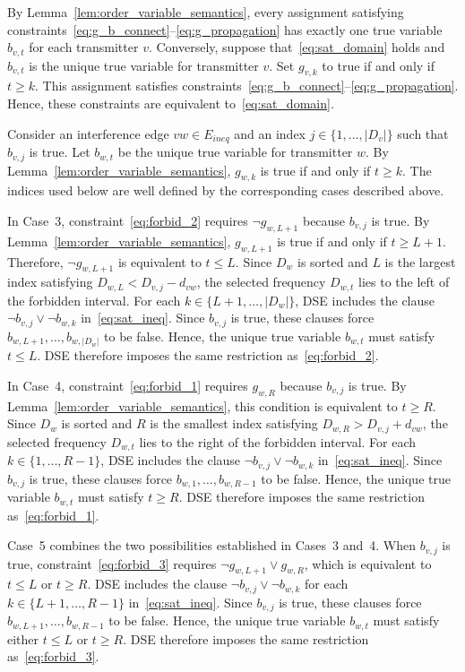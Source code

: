 \documentclass[letterpaper,journal]{IEEEtran}
\begin{document}
\begin{IEEEproof}
By Lemma~\ref{lem:order_variable_semantics}, every assignment satisfying constraints~\eqref{eq:g_b_connect}--\eqref{eq:g_propagation} has exactly one true variable $b_{v,t}$ for each transmitter $v$. Conversely, suppose that~\eqref{eq:sat_domain} holds and $b_{v,t}$ is the unique true variable for transmitter $v$. Set $g_{v,k}$ to true if and only if $t\ge k$. This assignment satisfies constraints~\eqref{eq:g_b_connect}--\eqref{eq:g_propagation}. Hence, these constraints are equivalent to~\eqref{eq:sat_domain}.

Consider an interference edge $vw\in E_{ineq}$ and an index $j\in\{1,\ldots,|D_v|\}$ such that $b_{v,j}$ is true. Let $b_{w,t}$ be the unique true variable for transmitter $w$. By Lemma~\ref{lem:order_variable_semantics}, $g_{w,k}$ is true if and only if $t\ge k$.
The indices used below are well defined by the corresponding cases described above.

In Case~3, constraint~\eqref{eq:forbid_2} requires $\neg g_{w,L+1}$ because $b_{v,j}$ is true. By Lemma~\ref{lem:order_variable_semantics}, $g_{w,L+1}$ is true if and only if $t\ge L+1$. Therefore, $\neg g_{w,L+1}$ is equivalent to $t\le L$. Since $D_w$ is sorted and $L$ is the largest index satisfying $D_{w,L}<D_{v,j}-d_{vw}$, the selected frequency $D_{w,t}$ lies to the left of the forbidden interval.
For each $k\in\{L+1,\ldots,|D_w|\}$, DSE includes the clause $\neg b_{v,j}\lor\neg b_{w,k}$ in~\eqref{eq:sat_ineq}. Since $b_{v,j}$ is true, these clauses force $b_{w,L+1},\ldots,b_{w,|D_w|}$ to be false. Hence, the unique true variable $b_{w,t}$ must satisfy $t\le L$. DSE therefore imposes the same restriction as~\eqref{eq:forbid_2}.

In Case~4, constraint~\eqref{eq:forbid_1} requires $g_{w,R}$ because $b_{v,j}$ is true. By Lemma~\ref{lem:order_variable_semantics}, this condition is equivalent to $t\ge R$. Since $D_w$ is sorted and $R$ is the smallest index satisfying $D_{w,R}>D_{v,j}+d_{vw}$, the selected frequency $D_{w,t}$ lies to the right of the forbidden interval.
For each $k\in\{1,\ldots,R-1\}$, DSE includes the clause $\neg b_{v,j}\lor\neg b_{w,k}$ in~\eqref{eq:sat_ineq}. Since $b_{v,j}$ is true, these clauses force $b_{w,1},\ldots,b_{w,R-1}$ to be false. Hence, the unique true variable $b_{w,t}$ must satisfy $t\ge R$. DSE therefore imposes the same restriction as~\eqref{eq:forbid_1}.

Case~5 combines the two possibilities established in Cases~3 and~4. When $b_{v,j}$ is true, constraint~\eqref{eq:forbid_3} requires $\neg g_{w,L+1}\lor g_{w,R}$, which is equivalent to $t\le L$ or $t\ge R$. DSE includes the clause $\neg b_{v,j}\lor\neg b_{w,k}$ for each $k\in\{L+1,\ldots,R-1\}$ in~\eqref{eq:sat_ineq}. Since $b_{v,j}$ is true, these clauses force $b_{w,L+1},\ldots,b_{w,R-1}$ to be false. Hence, the unique true variable $b_{w,t}$ must satisfy either $t\le L$ or $t\ge R$. DSE therefore imposes the same restriction as~\eqref{eq:forbid_3}.


\end{IEEEproof}
\end{document}

